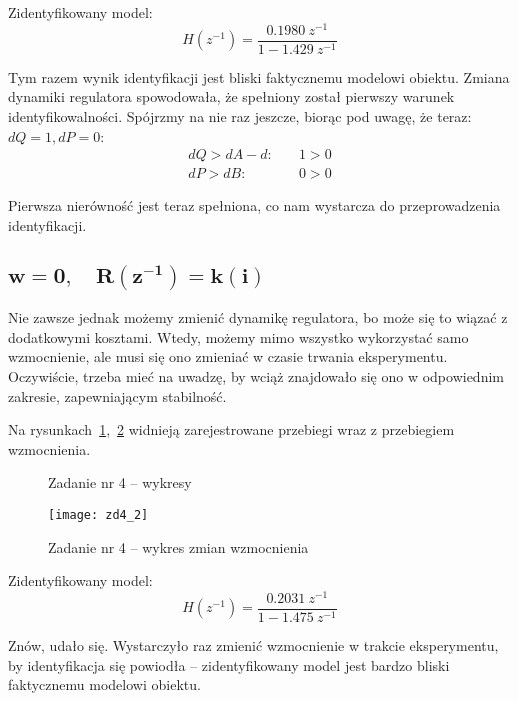 \documentclass[11pt, a4paper]{article}
\begin{document}
Zidentyfikowany model:
\[
	H(z^{-1}) = \frac{0.1980 \ z^{-1}}{1 - 1.429 \ z^{-1}}
\]

Tym razem wynik identyfikacji jest bliski faktycznemu modelowi obiektu. Zmiana dynamiki regulatora spowodowała, że spełniony został pierwszy warunek identyfikowalności. Spójrzmy na nie raz jeszcze, biorąc pod uwagę, że teraz: $dQ = 1, dP = 0$:
\begin{align*}
	dQ > dA - d:& \quad 1 > 0 \\
	dP > dB:& \quad 0 > 0
\end{align*}

Pierwsza nierówność jest teraz spełniona, co nam wystarcza do przeprowadzenia identyfikacji.

\subsection{$\displaystyle \mathbf{w = 0, \quad R(z^{-1}) = k(i)}$}

Nie zawsze jednak możemy zmienić dynamikę regulatora, bo może się to wiązać z dodatkowymi kosztami. Wtedy, możemy mimo wszystko wykorzystać samo wzmocnienie, ale musi się ono zmieniać w czasie trwania eksperymentu. Oczywiście, trzeba mieć na uwadzę, by wciąż znajdowało się ono w odpowiednim zakresie, zapewniającym stabilność.

Na rysunkach~\ref{fig:zd4},~\ref{fig:zd4_2} widnieją zarejestrowane przebiegi wraz z przebiegiem wzmocnienia.
\begin{figure}[htbp!]
	\centering
	\hfill%
	\caption{Zadanie nr 4 -- wykresy}
	\label{fig:zd4}
\end{figure}

\begin{figure}[htbp!]
	\centering
	\texttt{[image: zd4\_2]}%
	\caption{Zadanie nr 4 -- wykres zmian wzmocnienia}
	\label{fig:zd4_2}
\end{figure}

Zidentyfikowany model:
\[
	H(z^{-1}) = \frac{0.2031 \ z^{-1}}{1 - 1.475 \ z^{-1}}
\]

Znów, udało się. Wystarczyło raz zmienić wzmocnienie w trakcie eksperymentu, by identyfikacja się powiodła -- zidentyfikowany model jest bardzo bliski faktycznemu modelowi obiektu.
\end{document}
